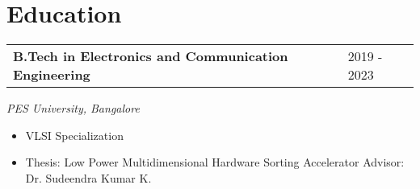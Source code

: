 \section{\sc Education}
\begin{tabular}{@{}p{4in}p{2in}}
  {\bf{B.Tech in Electronics and Communication Engineering}}  & 2019 - 2023\\
\end{tabular}
\textit{PES University, Bangalore}
\vspace{0.4em}
\begin{itemize}
  \setlength\itemsep{0em}
\item VLSI Specialization
\item Thesis: Low Power Multidimensional Hardware Sorting Accelerator
  \subitem Advisor: Dr. Sudeendra Kumar K.
\end{itemize}
\endinput
